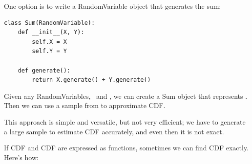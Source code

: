 \documentclass[12pt]{book}
\begin{document}
One option is to write a RandomVariable object that generates
the sum:
%
\begin{verbatim}
class Sum(RandomVariable):
    def __init__(X, Y):
        self.X = X
        self.Y = Y

    def generate():
        return X.generate() + Y.generate()
\end{verbatim}

Given any RandomVariables, \X~and \Y, we can create a Sum
object that represents \Z.  Then we can use a sample from \Z
to approximate CDF.

This approach is simple and versatile, but not very efficient; we
have to generate a large sample to estimate CDF accurately, and
even then it is not exact.

If CDF and CDF are expressed as functions, sometimes we can
find CDF exactly.  Here's how:

\newcommand{\infint}{\int_{-\infty}^{\infty}}
\newcommand{\spa}{~}
\newcommand{\given}{~|~}
\end{document}

